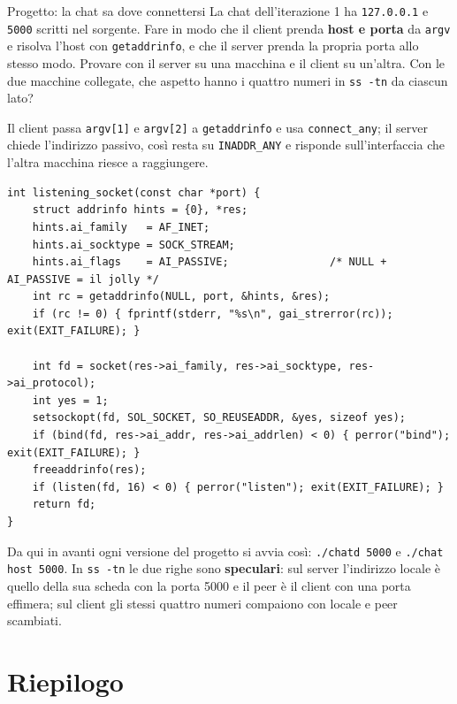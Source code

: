 \begin{esercizio}{Progetto: la chat sa dove connettersi}
La chat dell'iterazione 1 ha \texttt{127.0.0.1} e \texttt{5000} scritti nel sorgente. Fare in modo che il client prenda
\textbf{host e porta} da \texttt{argv} e risolva l'host con \texttt{getaddrinfo}, e che il server prenda la propria porta
allo stesso modo. Provare con il server su una macchina e il client su un'altra. Con le due macchine collegate, che
aspetto hanno i quattro numeri in \texttt{ss -tn} da ciascun lato?

\svolgimento
Il client passa \texttt{argv[1]} e \texttt{argv[2]} a \texttt{getaddrinfo} e usa \texttt{connect\_any}; il server chiede
l'indirizzo passivo, così resta su \texttt{INADDR\_ANY} e risponde sull'interfaccia che l'altra macchina riesce a
raggiungere.

\begin{lstlisting}[language={[POSIX]C}, style=wnumbers, title={chatd.c: il socket di ascolto su una porta data}]
int listening_socket(const char *port) {
    struct addrinfo hints = {0}, *res;
    hints.ai_family   = AF_INET;
    hints.ai_socktype = SOCK_STREAM;
    hints.ai_flags    = AI_PASSIVE;                /* NULL + AI_PASSIVE = il jolly */
    int rc = getaddrinfo(NULL, port, &hints, &res);
    if (rc != 0) { fprintf(stderr, "%s\n", gai_strerror(rc)); exit(EXIT_FAILURE); }

    int fd = socket(res->ai_family, res->ai_socktype, res->ai_protocol);
    int yes = 1;
    setsockopt(fd, SOL_SOCKET, SO_REUSEADDR, &yes, sizeof yes);
    if (bind(fd, res->ai_addr, res->ai_addrlen) < 0) { perror("bind"); exit(EXIT_FAILURE); }
    freeaddrinfo(res);
    if (listen(fd, 16) < 0) { perror("listen"); exit(EXIT_FAILURE); }
    return fd;
}
\end{lstlisting}

Da qui in avanti ogni versione del progetto si avvia così: \texttt{./chatd 5000} e \texttt{./chat host 5000}. In
\texttt{ss -tn} le due righe sono \textbf{speculari}: sul server l'indirizzo locale è quello della sua scheda con la porta
5000 e il peer è il client con una porta effimera; sul client gli stessi quattro numeri compaiono con locale e peer
scambiati.
\end{esercizio}

\section{Riepilogo}

